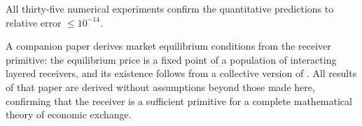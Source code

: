 \documentclass[twocolumn,11pt,a4paper]{article}
\begin{document}
All thirty-five numerical experiments confirm the quantitative predictions
to relative error $\leq 10^{-14}$.

A companion paper derives market equilibrium conditions from the receiver
primitive: the equilibrium price is a fixed point of a population of
interacting layered receivers, and its existence follows from a collective
version of .  All results of that paper are derived
without assumptions beyond those made here, confirming that the receiver
is a sufficient primitive for a complete mathematical theory of economic
exchange.



\end{document}
